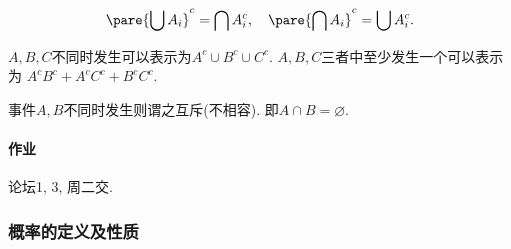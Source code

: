 \documentclass{ctexart}
\begin{document}
\begin{theorem}[De Morgan律]
    \[ \pare{\bigcup A_i}^c = \bigcap A_i^c,\quad \pare{\bigcap A_i}^c = \bigcup A_i^c. \]
\end{theorem}
\begin{sample}
    \begin{ex}
        $A,B,C$不同时发生可以表示为$A^c\cup B^c \cup C^c$. $A,B,C$三者中至少发生一个可以表示为
    $A^cB^c + A^cC^c + B^cC^c$.
    \end{ex}
\end{sample}
\begin{definition}[事件的互斥]
    事件$A,B$不同时发生则谓之互斥(不相容). 即$A\cap B = \varnothing$.
\end{definition}

\paragraph{作业} %
\label{par:作业}

论坛1, 3, 周二交.


\subsubsection{概率的定义及性质} %
\label{ssub:概率的定义及性质}
\end{document}
